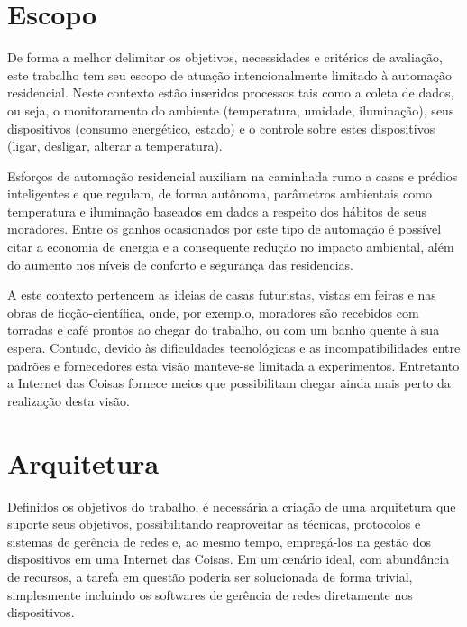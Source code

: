 \documentclass[twoside,english,brazilian]{UNISINOSmonografia}
\begin{document}
\section{Escopo}

De forma a melhor delimitar os objetivos, necessidades e critérios de 
avaliação, este trabalho tem seu escopo de atuação intencionalmente limitado 
à automação residencial.
Neste contexto estão inseridos processos tais como a coleta de dados, ou seja, 
o monitoramento do ambiente (temperatura, umidade, iluminação), 
seus dispositivos (consumo energético, estado) e 
o controle sobre estes dispositivos (ligar, desligar, alterar a temperatura).


Esforços de automação residencial auxiliam na caminhada rumo a casas e prédios 
inteligentes e que regulam, de forma autônoma, parâmetros ambientais como 
temperatura e iluminação baseados em dados a respeito dos hábitos de seus 
moradores.
Entre os ganhos ocasionados por este tipo de automação é possível citar a 
economia de energia e a consequente redução no impacto ambiental, além do 
aumento nos níveis de conforto e segurança das residencias.


A este contexto pertencem as ideias de casas futuristas, vistas em feiras e 
nas obras de ficção-científica, onde, por exemplo, moradores são recebidos com 
torradas e café prontos ao chegar do trabalho, ou com um banho quente à sua 
espera.
Contudo, devido às dificuldades tecnológicas e as incompatibilidades entre 
padrões e fornecedores esta visão manteve-se limitada a experimentos.
Entretanto a Internet das Coisas fornece meios que possibilitam chegar ainda 
mais perto da realização desta visão.


\section{Arquitetura}

Definidos os objetivos do trabalho, é necessária a criação de uma arquitetura 
que suporte seus objetivos, possibilitando reaproveitar as técnicas, 
protocolos e sistemas de gerência de redes e, ao mesmo tempo, empregá-los na 
gestão dos dispositivos em uma Internet das Coisas.
Em um cenário ideal, com abundância de recursos, a tarefa em questão poderia 
ser solucionada de forma trivial, simplesmente incluindo os softwares de 
gerência de redes diretamente nos dispositivos.
\end{document}
